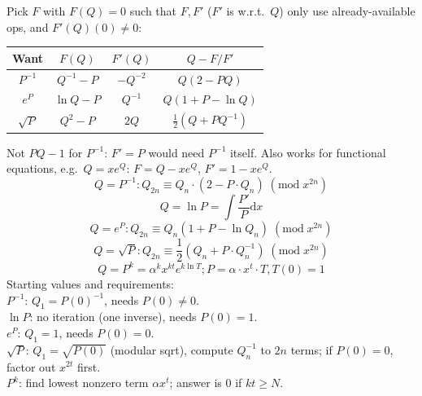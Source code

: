 Pick $F$ with $F(Q) = 0$ such that $F, F'$ ($F'$ is w.r.t.\ $Q$) only use already-available ops, and $F'(Q)(0) \ne 0$:
\begin{center}
\begin{tabular}{c|c|c|c}
Want & $F(Q)$ & $F'(Q)$ & $Q - F/F'$ \\ \hline
$P^{-1}$ & $Q^{-1} - P$ & $-Q^{-2}$ & $Q(2 - PQ)$ \\
$e^P$ & $\ln Q - P$ & $Q^{-1}$ & $Q(1 + P - \ln Q)$ \\
$\sqrt{P}$ & $Q^2 - P$ & $2Q$ & $\frac{1}{2}(Q + P Q^{-1})$ \\
\end{tabular}
\end{center}
Not $PQ - 1$ for $P^{-1}$: $F' = P$ would need $P^{-1}$ itself.
Also works for functional equations, e.g.\ $Q = x e^Q$: $F = Q - x e^Q$, $F' = 1 - x e^Q$.
\[Q = P^{-1}: Q_{2n} \equiv Q_{n} \cdot (2 - P \cdot Q_{n})\;(\mathrm{mod}\; x^{2n}) \]
\[Q = \ln{P} = \int\frac{P'}{P} \mathrm{d}x \]
\[Q = e^{P}: Q_{2n} \equiv Q_{n}(1 + P - \ln{Q_n})\;(\mathrm{mod}\; x^{2n}) \]
\[Q = \sqrt{P}: Q_{2n} \equiv \frac{1}{2}(Q_{n} + P \cdot Q_{n}^{-1})\;(\mathrm{mod}\; x^{2n}) \]
\[Q = P^{k} = \alpha^{k}x^{kt}e^{k\ln{T}}; P = \alpha \cdot x^{t} \cdot T, T(0) = 1 \]
Starting values and requirements: \\
$P^{-1}$: $Q_1 = P(0)^{-1}$, needs $P(0) \ne 0$. \\
$\ln P$: no iteration (one inverse), needs $P(0) = 1$. \\
$e^P$: $Q_1 = 1$, needs $P(0) = 0$. \\
$\sqrt{P}$: $Q_1 = \sqrt{P(0)}$ (modular sqrt), compute $Q_n^{-1}$ to $2n$ terms; if $P(0) = 0$, factor out $x^{2t}$ first. \\
$P^k$: find lowest nonzero term $\alpha x^t$; answer is $0$ if $kt \ge N$.

